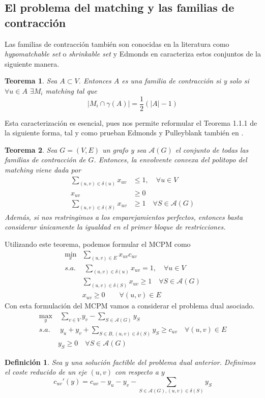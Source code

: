 \documentclass[twoside,a4paper,openright,12pt,tikz]{book}
\newtheorem{defi}{Definici\'on}[section]
\newtheorem{thm}{Teorema}[section]
\begin{document}
\subsection{El problema del matching y las familias de contracción}
Las familias de contracción también son conocidas en la literatura como \textit{hypomatchable set} o \textit{shrinkable set} y Edmonds en \cite{edmon3} caracteriza estos conjuntos de la siguiente manera.
\begin{thm}
Sea $A \subset V$. Entonces $A$ es una familia de contracción si y solo si $\forall u \in A$ $\exists M_i$ matching tal que 
$$
|M_i\cap \gamma(A)| = \frac{1}{2}(|A|-1)
$$
\end{thm}
Esta caracterización es esencial, pues nos permite reformular el Teorema 1.1.1 de la siguiente forma, tal y como prueban Edmonds y Pulleyblank también en \cite{edmon3}.
\begin{thm}
Sea $G=(V,E)$ un grafo y sea $\mathcal{A}(G)$ el conjunto de todas las familias de contracción de $G$. Entonces, la envolvente convexa del politopo del matching viene dada por
\begin{align*}
\sum_{(u,v)\in\delta(u)} x_{uv} &\leq 1, \quad \forall u\in V\\
x_{uv} &\geq 0\\
\sum_{(u,v)\in \delta(S)} x_{uv}& \geq 1 \quad \forall S \in \mathcal{A}(G)	
\end{align*}
Además, si nos restringimos a los emparejamientos perfectos, entonces basta considerar únicamente la igualdad en el primer bloque de restricciones.
\end{thm}
Utilizando este teorema, podemos formular el MCPM como
\begin{align*}
\min_x & \sum_{(u,v) \in E}x_{uv}c_{uv}\\
s.a.&\;\sum_{(u,v)\in\delta(u)} x_{uv} =	 1, \quad \forall u \in V\\
&\sum_{(u,v)\in \delta(S)} x_{uv} \geq 1\quad \forall S \in \mathcal{A}(G)	\\
&x_{uv} \geq 0 \qquad \forall(u,v)\in E
\end{align*}
Con esta formulación del MCPM vamos a considerar el problema dual asociado.
\begin{align*}
\max_{y} &\; \sum_{v\in V} y_v - \sum_{S\in \mathcal{A}(G)} y_S\\
s.a.&\;y_u+y_v + \sum_{S\in B,(u,v)\in \delta(S)}y_S  \geq c_{uv} \quad \forall (u,v)\in E\\
&y_S\geq 0 \quad \forall S\in \mathcal{A}(G)
\end{align*}
\begin{defi}
Sea $y$ una solución factible del problema dual anterior. Definimos el coste reducido de un eje $(u,v)$ con respecto a $y$
$$
c_{uv}'(y) = c_{uv} - y_u -y_v - \sum_{S\in \mathcal{A}(G),(u,v)\in \delta(S)} y_S
$$ 

\end{defi}
\end{document}

